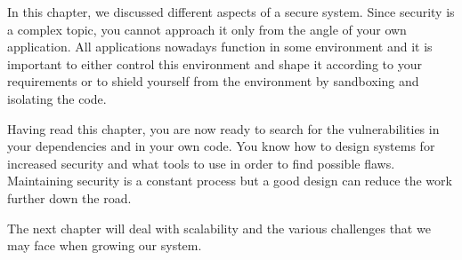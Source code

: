 In this chapter, we discussed different aspects of a secure system. Since security is a complex topic, you cannot approach it only from the angle of your own application. All applications nowadays function in some environment and it is important to either control this environment and shape it according to your requirements or to shield yourself from the environment by sandboxing and isolating the code. 

Having read this chapter, you are now ready to search for the vulnerabilities in your dependencies and in your own code. You know how to design systems for increased security and what tools to use in order to find possible flaws. Maintaining security is a constant process but a good design can reduce the work further down the road.

The next chapter will deal with scalability and the various challenges that we may face when growing our system.